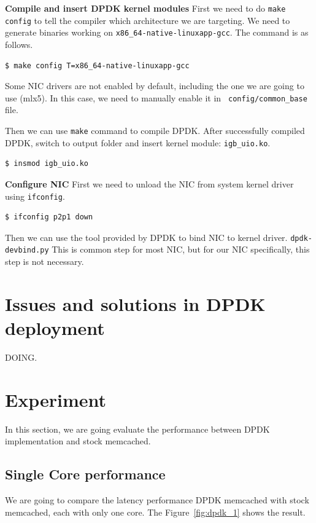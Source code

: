 \documentclass[bsc,frontabs,twoside,singlespacing,parskip,deptreport]{infthesis}     %
\begin{document}

\textbf{Compile and insert DPDK kernel modules} First we need to do \texttt{make config} to tell the compiler which architecture we are targeting. We need to generate binaries working on \texttt{x86\_64-native-linuxapp-gcc}. The command is as follows.


\begin{verbatim}
$ make config T=x86_64-native-linuxapp-gcc
\end{verbatim}


Some NIC drivers are not enabled by default, including the one we are going to use (mlx5). In this case, we need to manually enable it in \texttt{ config/common\_base} file.

Then we can use \texttt{make} command to compile DPDK. After successfully compiled DPDK, switch to output folder and insert kernel module: \texttt{igb\_uio.ko}.

\begin{verbatim}
$ insmod igb_uio.ko
\end{verbatim}



\textbf{Configure NIC} First we need to unload the NIC from system kernel driver using \texttt{ifconfig}. 

\begin{verbatim}
$ ifconfig p2p1 down
\end{verbatim}

 Then we can use the tool provided by DPDK to bind NIC to kernel driver. \texttt{dpdk-devbind.py} This is common step for most NIC, but for our NIC specifically, this step is not necessary.


\section{Issues and solutions in DPDK deployment}
DOING.

\section{Experiment}
In this section, we are going evaluate the performance between DPDK implementation and stock memcached. 

\subsection{Single Core performance}
We are going to compare the latency performance DPDK memcached with stock memcached, each with only one core. The Figure~\ref{fig:dpdk_1} shows the result. 
\end{document}
